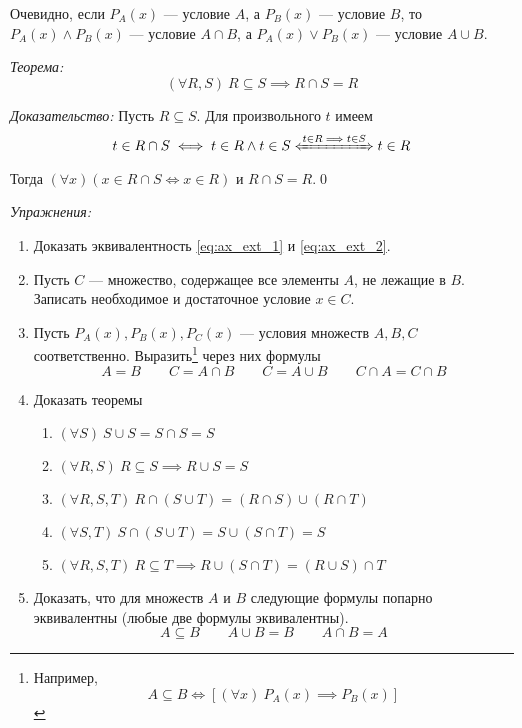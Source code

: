 Очевидно, если $P_{A}(x)$ --- условие $A$, а $P_{B}(x)$ --- условие $B$,
то $P_{A}(x)\land P_{B}(x)$ --- условие $A\cap B$,
а $P_{A}(x)\lor P_{B}(x)$ --- условие $A\cup B$.

\vspace{1em}
{\it Теорема:}
\[
  (\forall R,S)~R\subseteq S\implies R\cap S=R
\]

{\it Доказательство:}
Пусть $R\subseteq S$. Для произвольного $t$ имеем
\[
  t\in R\cap S\iff t\in R\land t\in S\xLeftrightarrow{t\in R\implies t\in S} t\in R
\]
Тогда $(\forall x)(x\in R\cap S\iff x\in R)$ и $R\cap S=R$.\qed

\newcommand\eset{\varnothing}
\vspace{1em}
{\it Упражнения:}
\begin{enumerate}
  \item{}Доказать эквивалентность \eqref{eq:ax_ext_1} и \eqref{eq:ax_ext_2}.

  \item{}Пусть $C$ --- множество, содержащее все элементы $A$, не лежащие в $B$.
  Записать необходимое и достаточное условие $x\in C$.

  \item{}Пусть $P_{A}(x), P_{B}(x),P_{C}(x)$ --- условия множеств
  $A,B,C$ соответственно. Выразить\footnote{Например,
  \[
    A\subseteq B\iff
    [(\forall x)~P_{A}(x)\implies P_{B}(x)]
  \]} через них формулы
  \[
    A=B\qquad C=A\cap B\qquad C=A\cup B\qquad C\cap A=C\cap B
  \]

  \item{}Доказать теоремы
  \begin{enumerate}
    \item{}$(\forall S)~S\cup S=S\cap S=S$
    \item{}$(\forall R,S)~R\subseteq S\implies R\cup S=S$
    \item{}$(\forall R,S,T)~R\cap (S\cup T)=(R\cap S)\cup (R\cap T)$
    \item{}$(\forall S, T)~S\cap (S\cup T)=S\cup (S\cap T)=S$
    \item{}$(\forall R,S, T)~R\subseteq T\implies R\cup (S\cap T)=(R\cup S)\cap T$
  \end{enumerate}


  \item{}Доказать, что для множеств $A$ и $B$ следующие формулы попарно эквивалентны
  (любые две формулы эквивалентны).
  \[
    A\subseteq B\qquad A\cup B=B\qquad A\cap B=A
  \]
\end{enumerate}

